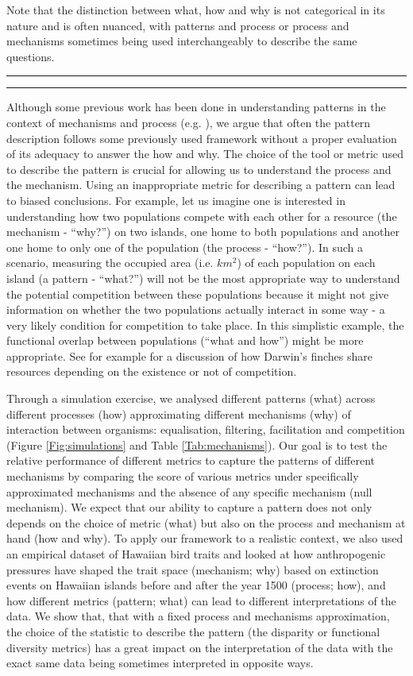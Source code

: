 \documentclass[12pt,letterpaper]{article}
\begin{document}
Note that the distinction between what, how and why is not categorical in its nature and is often nuanced, with patterns and process or process and mechanisms sometimes being used interchangeably to describe the same questions.

\bigskip
\hrule
\hrule
\bigskip

Although some previous work has been done in understanding patterns in the context of mechanisms and process (e.g. \cite{novack2016general1,novack2016general2}), we argue that often the pattern description follows some previously used framework without a proper evaluation of its adequacy to answer the how and why.
The choice of the tool or metric used to describe the pattern is crucial for allowing us to understand the process and the mechanism.
Using an inappropriate metric for describing a pattern can lead to biased conclusions.
For example, let us imagine one is interested in understanding how two populations compete with each other for a resource (the mechanism - ``why?'') on two islands, one home to both populations and another one home to only one of the population (the process - ``how?'').
In such a scenario, measuring the occupied area (i.e. $km^{2}$) of each population on each island (a pattern - ``what?'') will not be the most appropriate way to understand the potential competition between these populations because it might not give information on whether the two populations actually interact in some way - a very likely condition for competition to take place.
In this simplistic example, the functional overlap between populations (``what and how'') might be more appropriate.
See for example \citealt{carvalho2020decomposing} for a discussion of how Darwin's finches share resources depending on the existence or not of competition.

Through a simulation exercise, we analysed different patterns (what) across different processes (how) approximating different mechanisms (why) of interaction between organisms: equalisation, filtering, facilitation and competition (Figure \ref{Fig:simulations} and Table \ref{Tab:mechanisms}).
Our goal is to test the relative performance of different metrics to capture the patterns of different mechanisms by comparing the score of various metrics under specifically approximated mechanisms and the absence of any specific mechanism (null mechanism).
We expect that our ability to capture a pattern does not only depends on the choice of metric (what) but also on the process and mechanism at hand (how and why).
To apply our framework to a realistic context, we also used an empirical dataset of Hawaiian bird traits and looked at how anthropogenic pressures have shaped the trait space (mechanism; why) based on extinction events on Hawaiian islands before and after the year 1500 (process; how), and how different metrics (pattern; what) can lead to different interpretations of the data.
We show that, that with a fixed process and mechanisms approximation, the choice of the statistic to describe the pattern (the disparity or functional diversity metrics) has a great impact on the interpretation of the data with the exact same data being sometimes interpreted in opposite ways.
\end{document}
